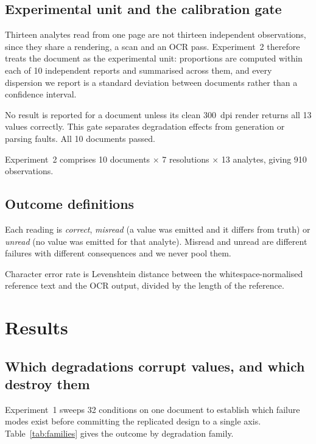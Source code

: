 \documentclass[11pt]{article}
\begin{document}
\subsection{Experimental unit and the calibration gate}

Thirteen analytes read from one page are not thirteen independent observations, since they share
a rendering, a scan and an OCR pass. Experiment~2 therefore treats the document as the
experimental unit: proportions are computed within each of 10 independent reports and summarised
across them, and every dispersion we report is a standard deviation between documents rather
than a confidence interval.

No result is reported for a document unless its clean 300~dpi render returns all 13 values
correctly. This gate separates degradation effects from generation or parsing faults. All 10
documents passed.

Experiment~2 comprises 10 documents $\times$ 7 resolutions $\times$ 13 analytes, giving 910
observations.

\subsection{Outcome definitions}

Each reading is \emph{correct}, \emph{misread} (a value was emitted and it differs from truth)
or \emph{unread} (no value was emitted for that analyte). Misread and unread are different
failures with different consequences and we never pool them.

Character error rate is Levenshtein distance between the whitespace-normalised reference text
and the OCR output, divided by the length of the reference.

\section{Results}

\subsection{Which degradations corrupt values, and which destroy them}

Experiment~1 sweeps 32 conditions on one document to establish which failure modes exist before
committing the replicated design to a single axis. Table~\ref{tab:families} gives the outcome by
degradation family.
\end{document}
